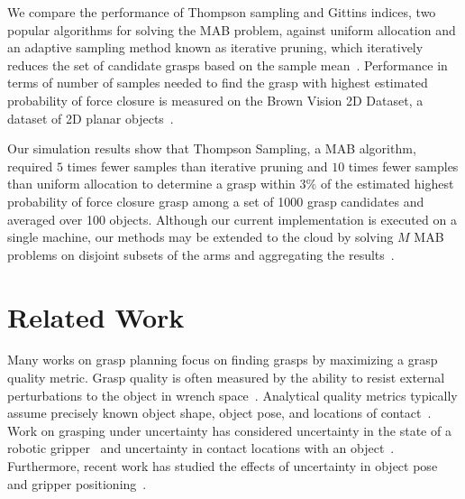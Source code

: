 \documentclass[10pt, conference]{ieeeconf}      %
\begin{document}
We compare the performance of Thompson sampling and Gittins indices, two popular algorithms for solving the MAB problem,
against uniform allocation and an adaptive sampling method known as iterative pruning, which iteratively reduces the set
of candidate grasps based on the sample mean~\cite{kehoe2012toward}. 
Performance in terms of number of samples needed to find the grasp with highest estimated probability of force closure is measured on the Brown Vision 2D Dataset, a dataset of 2D planar objects~\cite{brown, christopoulos2007handling}.

Our simulation results show that Thompson Sampling, a MAB algorithm, required $5$ times fewer samples than iterative
pruning and $10$ times fewer samples than uniform allocation to determine a grasp within $3\%$ of the estimated highest probability of force closure
grasp among a set of 1000 grasp candidates and averaged over 100 objects.
Although our current implementation is executed on a single machine, our methods may be extended to the cloud by solving $M$ MAB problems on disjoint subsets of the arms and aggregating the results~\cite{glazebrook2000index}.


\section{Related Work}

Many works on grasp planning focus on finding grasps by maximizing a grasp quality metric. Grasp quality is often measured by the ability to resist external perturbations to the object in wrench space~\cite{ferrari1992, miller2004graspit}. Analytical quality metrics typically assume precisely known object shape, object pose, and locations of contact~\cite{cheong2011output, ciocarlie2009}. Work on grasping under uncertainty has considered uncertainty in the state of a robotic gripper~\cite{goldberg1990bayesian, stulp2011learning} and uncertainty in contact locations with an object~\cite{zheng2005}. Furthermore, recent work has studied the effects of uncertainty in object pose and gripper positioning~\cite{brook2011collaborative, hsiao2011bayesian}.
\end{document}
